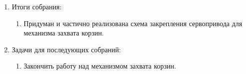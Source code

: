 \begin{enumerate}
	\item Итоги собрания: 
	\begin{enumerate}
	  \item Придуман и частично реализована схема закрепления сервопривода для механизма захвата корзин.
	  
    \end{enumerate}
    
	\item Задачи для последующих собраний:
	\begin{enumerate}
	  \item Закончить работу над механизмом захвата корзин.
	  
    \end{enumerate}     
\end{enumerate}
\fillpage
